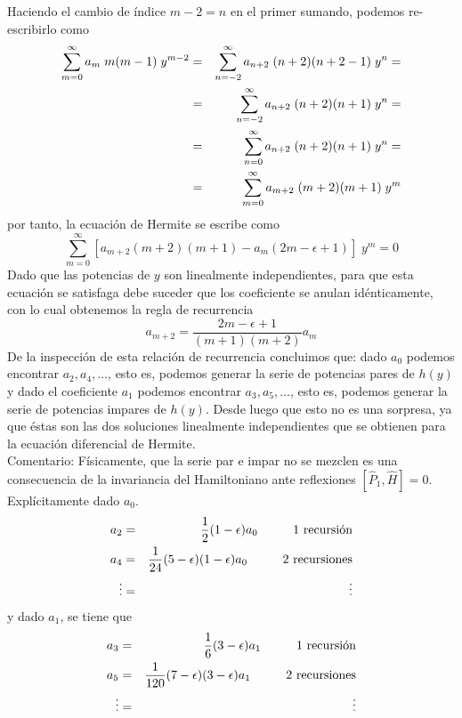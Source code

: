 Haciendo el cambio de índice $m - 2 = n$ en el primer sumando, podemos re-escribirlo como
\begin{eqnarray*}
\sum_{m=0}^{\infty} a_{m} \; m(m-1) \; y^{m-2} &=& \sum_{n=-2}^{\infty} a_{n+2} \; (n + 2)(n + 2 - 1) \; y^{n} = \nonumber \\
&=& \sum_{n=-2}^{\infty} a_{n + 2} \; (n + 2)(n + 1) \; y^{n} = \nonumber \\ 
&=& \sum_{n = 0}^{\infty} a_{n + 2} \; (n + 2)(n + 1) \; y^{n} = \nonumber \\
&=& \sum_{m = 0}^{\infty} a_{m + 2} \; (m + 2)(m + 1) \; y^{m}
\end{eqnarray*}
por tanto, la ecuación de Hermite se escribe como
\begin{equation}
\sum_{m = 0}^{\infty} \left[ a_{m + 2} (m + 2)(m + 1) - a_{m} (2 m - \epsilon + 1) \right] \; y^{m} = 0
\label{eq:ecuacion_06_14} 
\end{equation}
Dado que las potencias de $y$ son linealmente independientes, para que esta ecuación se satisfaga debe suceder que los coeficiente se anulan idénticamente, con lo cual obtenemos la regla de recurrencia
\begin{equation}
a_{m + 2} = \dfrac{2m - \epsilon + 1}{(m + 1)(m + 2)} a_{m}
\label{eq:ecuacion_06_15}
\end{equation}
De la inspección de esta relación de recurrencia concluimos que: dado $a_{0}$ podemos encontrar $a_{2}, a_{4}, \ldots $, esto es, podemos generar la serie de potencias pares de $h(y)$ y dado el coeficiente $a_{1}$ podemos encontrar $a_{3}, a_{5}, \ldots $, esto es, podemos generar la serie de potencias impares de $h(y)$. Desde luego que esto no es una sorpresa, ya que éstas son las dos soluciones linealmente independientes que se obtienen para la ecuación diferencial de Hermite.
\\
Comentario: Físicamente, que la serie par e impar no se mezclen es una consecuencia de la invariancia del Hamiltoniano ante reflexiones $[\widehat{P}_{1} , \widehat{H}] = 0$. Explícitamente dado $a_{0}$.
\begin{eqnarray*}
a_{2} &=& \dfrac{1}{2} (1 - \epsilon) a_{0} \hspace{1cm} \text{1 recursión} \nonumber \\
a_{4} &=& \dfrac{1}{24} (5 - \epsilon)(1 - \epsilon) a_{0} \hspace{1cm} \text{2 recursiones} \nonumber \\
\vdots &=& \vdots
\end{eqnarray*}
y dado $a_{1}$, se tiene que
\begin{eqnarray*}
a_{3} &=& \dfrac{1}{6} (3 - \epsilon) a_{1} \hspace{1cm} \text{1 recursión} \nonumber \\
a_{5} &=& \dfrac{1}{120} (7 - \epsilon)(3 - \epsilon) a_{1} \hspace{1cm} \text{2 recursiones} \nonumber \\
\vdots &=& \vdots
\end{eqnarray*}





